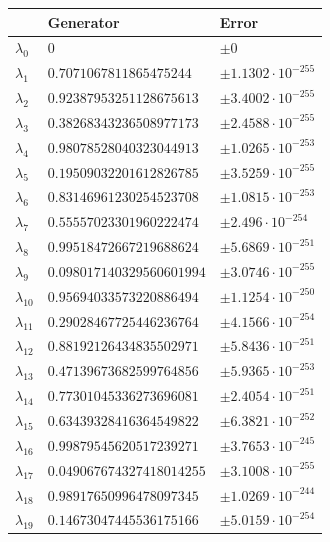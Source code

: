 \documentclass[a4paper,10pt]{article}
\begin{document}
\begin{appendix}
\begin{table}[h]
  \centering
  \begin{tabular}{|l|ll|}
  \hline
  {}             & Generator                 & Error \\
  \hline
  $\lambda_{0}$  & $0$                       &  $\pm 0$ \\
  $\lambda_{1}$  & $0.7071067811865475244$   &  $\pm 1.1302 \cdot 10^{-255}$ \\
  $\lambda_{2}$  & $0.92387953251128675613$  &  $\pm 3.4002 \cdot 10^{-255}$ \\
  $\lambda_{3}$  & $0.38268343236508977173$  &  $\pm 2.4588 \cdot 10^{-255}$ \\
  $\lambda_{4}$  & $0.98078528040323044913$  &  $\pm 1.0265 \cdot 10^{-253}$ \\
  $\lambda_{5}$  & $0.19509032201612826785$  &  $\pm 3.5259 \cdot 10^{-255}$ \\
  $\lambda_{6}$  & $0.83146961230254523708$  &  $\pm 1.0815 \cdot 10^{-253}$ \\
  $\lambda_{7}$  & $0.55557023301960222474$  &  $\pm 2.496 \cdot 10^{-254}$ \\
  $\lambda_{8}$  & $0.99518472667219688624$  &  $\pm 5.6869 \cdot 10^{-251}$ \\
  $\lambda_{9}$  & $0.098017140329560601994$ &  $\pm 3.0746 \cdot 10^{-255}$ \\
  $\lambda_{10}$ & $0.95694033573220886494$  &  $\pm 1.1254 \cdot 10^{-250}$ \\
  $\lambda_{11}$ & $0.29028467725446236764$  &  $\pm 4.1566 \cdot 10^{-254}$ \\
  $\lambda_{12}$ & $0.88192126434835502971$  &  $\pm 5.8436 \cdot 10^{-251}$ \\
  $\lambda_{13}$ & $0.47139673682599764856$  &  $\pm 5.9365 \cdot 10^{-253}$ \\
  $\lambda_{14}$ & $0.77301045336273696081$  &  $\pm 2.4054 \cdot 10^{-251}$ \\
  $\lambda_{15}$ & $0.63439328416364549822$  &  $\pm 6.3821 \cdot 10^{-252}$ \\
  $\lambda_{16}$ & $0.99879545620517239271$  &  $\pm 3.7653 \cdot 10^{-245}$ \\
  $\lambda_{17}$ & $0.049067674327418014255$ &  $\pm 3.1008 \cdot 10^{-255}$ \\
  $\lambda_{18}$ & $0.98917650996478097345$  &  $\pm 1.0269 \cdot 10^{-244}$ \\
  $\lambda_{19}$ & $0.14673047445536175166$  &  $\pm 5.0159 \cdot 10^{-254}$ \\

\end{tabular}
\end{table}
\end{appendix}
\end{document}
